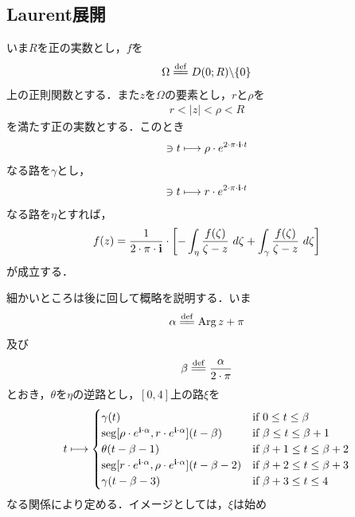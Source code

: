\subsection{Laurent展開}

	いま$R$を正の実数とし，$f$を
	\begin{align}
		\Omega \defeq \disc{0}{R} \backslash \{0\}
	\end{align}
	上の正則関数とする．また$z$を$\Omega$の要素とし，$r$と$\rho$を
	\begin{align}
		r < |z| < \rho < R
	\end{align}
	を満たす正の実数とする．このとき
	\begin{align}
		[0,1] \ni t \longmapsto \rho \cdot e^{2 \cdot \pi \cdot \isym \cdot t}
	\end{align}
	なる路を$\gamma$とし，
	\begin{align}
		[0,1] \ni t \longmapsto r \cdot e^{2 \cdot \pi \cdot \isym \cdot t}
	\end{align}
	なる路を$\eta$とすれば，
	\begin{align}
		f(z) = \frac{1}{2 \cdot \pi \cdot \mathbf{i}} \cdot 
		\left[-\int_{\eta} \frac{f(\zeta)}{\zeta-z}\ d\zeta + \int_{\gamma} \frac{f(\zeta)}{\zeta-z}\ d\zeta\right]
		\label{fom:Laurent_series_1}
	\end{align}
	が成立する．
	
	細かいところは後に回して概略を説明する．いま
	\begin{align}
		\alpha \defeq \pvarg{z} + \pi
	\end{align}
	及び
	\begin{align}
		\beta \defeq \frac{\alpha}{2 \cdot \pi}
	\end{align}
	とおき，$\theta$を$\eta$の逆路とし，$[0,4]$上の路$\xi$を
	\begin{align}
		t \longmapsto
		\begin{cases}
			\gamma(t) & \mbox{if } 0 \leq t \leq \beta \\
			\operatorname{seg}[\rho \cdot e^{\mathbf{i} \cdot \alpha},r \cdot e^{\mathbf{i} \cdot \alpha}](t-\beta) & \mbox{if } \beta \leq t \leq \beta + 1 \\
			\theta(t-\beta-1) & \mbox{if } \beta + 1 \leq t \leq \beta + 2 \\
			 \operatorname{seg}[r \cdot e^{\mathbf{i} \cdot \alpha},\rho \cdot e^{\mathbf{i} \cdot \alpha}](t-\beta-2) & \mbox{if } \beta + 2 \leq t \leq \beta + 3 \\
			\gamma(t-\beta-3) & \mbox{if } \beta + 3 \leq t \leq 4
		\end{cases}
	\end{align}
	なる関係により定める．イメージとしては，$\xi$は始め
	

